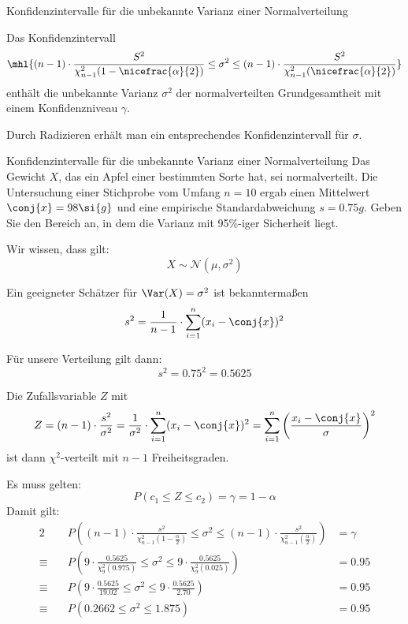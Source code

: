 \begin{algo}{Konfidenzintervalle für die unbekannte Varianz einer Normalverteilung}
\begin{enumerate}
              Das Konfidenzintervall
              \[
                  \mhl{(n-1) \cdot \frac{S^2}{\chi^2_{n-1}(1 - \nicefrac{\alpha}{2})} \leq \sigma^2 \leq (n-1) \cdot \frac{S^2}{\chi^2_{n-1} (\nicefrac{\alpha}{2})}}
              \]
              enthält die unbekannte Varianz $\sigma^2$ der normalverteilten Grundgesamtheit mit einem Konfidenzniveau $\gamma$.

              Durch Radizieren erhält man ein entsprechendes Konfidenzintervall für $\sigma$.
    \end{enumerate}
\end{algo}

\begin{example}{Konfidenzintervalle für die unbekannte Varianz einer Normalverteilung}
    Das Gewicht $X$, das ein Apfel einer bestimmten Sorte hat, sei normalverteilt.
    Die Untersuchung einer Stichprobe vom Umfang $n = 10$ ergab einen Mittelwert $\conj{x} = 98 \si{g}$ und eine empirische Standardabweichung $s = 0.75 \si{g}$.
    Geben Sie den Bereich an, in dem die Varianz mit 95\%-iger Sicherheit liegt.

    \exampleseparator

    Wir wissen, dass gilt:
    \[
        X \sim \mathcal{N}(\mu, \sigma^2)
    \]

    Ein geeigneter Schätzer für $\Var(X) = \sigma^2$ ist bekanntermaßen
    \[
        s^2 = \frac{1}{n-1} \cdot \sum_{i=1}^{n} (x_i - \conj{x})^2
    \]

    Für unsere Verteilung gilt dann:
    \[
        s^2 = 0.75^2 = 0.5625
    \]

    Die Zufallsvariable $Z$ mit
    \[
        Z = (n-1) \cdot \frac{s^2}{\sigma^2} = \frac{1}{\sigma^2} \cdot \sum_{i=1}^{n} (x_i - \conj{x})^2 = \sum_{i=1}^{n} \left(\frac{x_i - \conj{x}}{\sigma}\right)^2
    \]
    ist dann $\chi^2$-verteilt mit $n-1$ Freiheitsgraden.

    Es muss gelten:
    \[
        P(c_1 \leq Z \leq c_2) = \gamma = 1 - \alpha
    \]
    Damit gilt:
    \begin{alignat*}{2}
                     & P((n-1) \cdot \frac{s^2}{\chi^2_{n-1} \left( 1 - \frac{\alpha}{2} \right)} \leq  \sigma^2 \leq (n-1) \cdot \frac{s^2}{\chi^2_{n-1} \left(\frac{\alpha}{2} \right)}) & = \gamma \\
        \equiv \quad & P(9 \cdot \frac{0.5625}{\chi^2_{9} \left( 0.975 \right)}                   \leq \sigma^2  \leq 9 \cdot \frac{0.5625}{\chi^2_9 \left(0.025 \right)})                 & = 0.95   \\
        \equiv \quad & P(9 \cdot \frac{0.5625}{19.02}                                             \leq \sigma^2  \leq 9 \cdot \frac{0.5625}{2.70})                                         & = 0.95   \\
        \equiv \quad & P(0.2662                                                                   \leq \sigma^2  \leq 1.875)                                                               & = 0.95   \\
    \end{alignat*}


\end{example}
